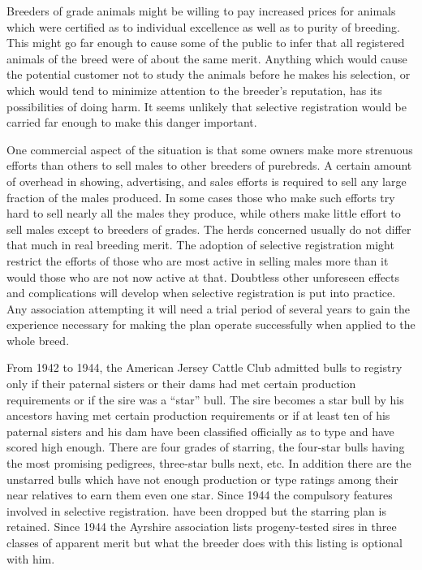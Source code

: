 Breeders of grade animals might be willing to pay increased prices
for animals which were certified as to individual excellence as well as to
purity of breeding. This might go far enough to cause some of the public
to infer that all registered animals of the breed were of about the
same merit. Anything which would cause the potential customer not to
study the animals before he makes his selection, or which would tend to
minimize attention to the breeder's reputation, has its possibilities of
doing harm. It seems unlikely that selective registration would be carried
far enough to make this danger important.

One commercial aspect of the situation is that some owners make
more strenuous efforts than others to sell males to other breeders of
purebreds. A certain amount of overhead in showing, advertising, and
sales efforts is required to sell any large fraction of the males produced.
In some cases those who make such efforts try hard to sell nearly all the
males they produce, while others make little effort to sell males except
to breeders of grades. The herds concerned usually do not differ that
much in real breeding merit. The adoption of selective registration
might restrict the efforts of those who are most active in selling males
more than it would those who are not now active at that. Doubtless
other unforeseen effects and complications will develop when selective
registration is put into practice. Any association attempting it will need
a trial period of several years to gain the experience necessary for making
the plan operate successfully when applied to the whole breed.

From 1942 to 1944, the American Jersey Cattle Club admitted bulls
to registry only if their paternal sisters or their dams had met certain
production requirements or if the sire was a ``star'' bull. The sire
becomes a star bull by his ancestors having met certain production
requirements or if at least ten of his paternal sisters and his dam have
been classified officially as to type and have scored high enough. There
are four grades of starring, the four-star bulls having the most promising
pedigrees, three-star bulls next, etc. In addition there are the
unstarred bulls which have not enough production or type ratings
among their near relatives to earn them even one star. Since 1944 the
compulsory features involved in selective registration. have been
dropped but the starring plan is retained. Since 1944 the Ayrshire association
lists progeny-tested sires in three classes of apparent merit but
what the breeder does with this listing is optional with him.

